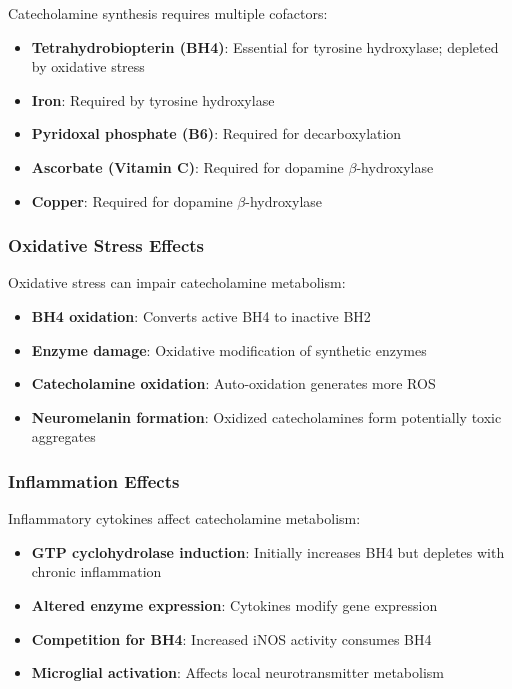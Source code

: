 Catecholamine synthesis requires multiple cofactors:

\begin{itemize}
    \item \textbf{Tetrahydrobiopterin (BH4)}: Essential for tyrosine hydroxylase; depleted by oxidative stress
    \item \textbf{Iron}: Required by tyrosine hydroxylase
    \item \textbf{Pyridoxal phosphate (B6)}: Required for decarboxylation
    \item \textbf{Ascorbate (Vitamin C)}: Required for dopamine $\beta$-hydroxylase
    \item \textbf{Copper}: Required for dopamine $\beta$-hydroxylase
\end{itemize}

\subsubsection{Oxidative Stress Effects}

Oxidative stress can impair catecholamine metabolism:

\begin{itemize}
    \item \textbf{BH4 oxidation}: Converts active BH4 to inactive BH2
    \item \textbf{Enzyme damage}: Oxidative modification of synthetic enzymes
    \item \textbf{Catecholamine oxidation}: Auto-oxidation generates more ROS
    \item \textbf{Neuromelanin formation}: Oxidized catecholamines form potentially toxic aggregates
\end{itemize}

\subsubsection{Inflammation Effects}

Inflammatory cytokines affect catecholamine metabolism:

\begin{itemize}
    \item \textbf{GTP cyclohydrolase induction}: Initially increases BH4 but depletes with chronic inflammation
    \item \textbf{Altered enzyme expression}: Cytokines modify gene expression
    \item \textbf{Competition for BH4}: Increased iNOS activity consumes BH4
    \item \textbf{Microglial activation}: Affects local neurotransmitter metabolism
\end{itemize}


